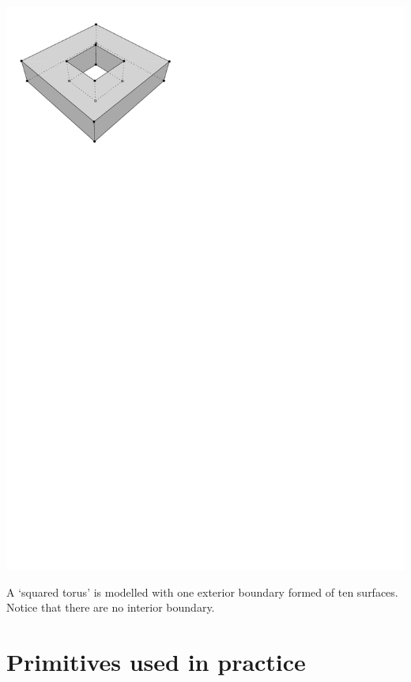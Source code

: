 \begin{marginfigure}
  \centering
  \includegraphics[width=0.8\linewidth]{figs/torus.pdf}
  \caption{A `squared torus' is modelled with one exterior boundary formed of ten surfaces. Notice that there are no interior boundary.}%
\label{fig:torus}
\end{marginfigure}


%
\section{Primitives used in practice}


